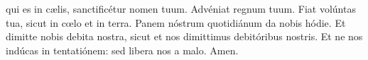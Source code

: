 qui es in c{\ae}lis, sanctificétur nomen tuum. Advéniat regnum tuum.
Fiat volúntas tua, sicut in c{\oe}lo et in terra. Panem nóstrum quotidiánum da nobis hódie.
Et dimitte nobis debita nostra, sicut et nos dimittimus debitóribus nostris.
Et ne nos indúcas in tentatiónem: sed libera nos a malo. Amen.